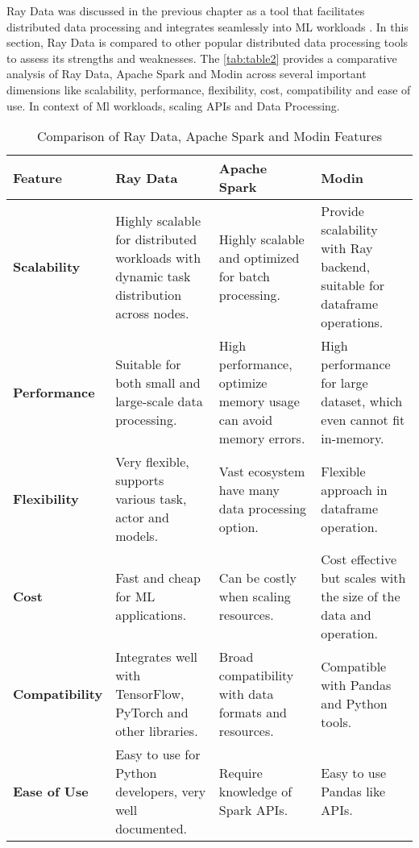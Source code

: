 Ray Data was discussed in the previous chapter as a tool that facilitates distributed data processing and integrates seamlessly into ML workloads \cite{ray_doc}. In this section, Ray Data is compared to other popular distributed data processing tools to assess its strengths and weaknesses. The \autoref{tab:table2} provides a comparative analysis of Ray Data, Apache Spark and Modin across several important dimensions like scalability, performance, flexibility, cost, compatibility and ease of use. In context of Ml workloads, scaling APIs and Data Processing.

\begin{table}[ht]
\centering
\begin{tabular}{|p{3cm}|p{3.5cm}|p{3.5cm}|p{3.5cm}|}
\hline
\textbf{Feature} & \textbf{Ray Data} & \textbf{Apache Spark} & \textbf{Modin} \\
\hline
\textbf{Scalability} & Highly scalable for distributed workloads with dynamic task distribution across nodes. \cite{ray_doc}& Highly scalable and optimized for batch processing. \cite{apache_spark} & Provide scalability with Ray backend, suitable for dataframe operations. \cite{modin_docs} \\
\hline
\textbf{Performance} & Suitable for both small and large-scale data processing. \cite{ray_doc} & High performance, optimize memory usage can avoid memory errors. \cite{apache_spark}& High performance for large dataset, which even cannot fit in-memory. \cite{modin_docs}\\
\hline
\textbf{Flexibility} & Very flexible, supports various task, actor and models. \cite{ray_doc}& Vast ecosystem have many data processing option. \cite{apache_spark} &Flexible approach in dataframe operation. \cite{modin_docs} \\
\hline
\textbf{Cost} & Fast and cheap for ML applications. \cite{ray_doc}& Can be costly when scaling resources. \cite{apache_spark}& Cost effective but scales with the size of the data and operation. \cite{modin_docs} \\
\hline
\textbf{Compatibility} & Integrates well with TensorFlow, PyTorch and other libraries. \cite{ray_doc}& Broad compatibility with data formats and resources. \cite{apache_spark} & Compatible with Pandas and Python tools. \cite{modin_docs} \\
\hline
\textbf{Ease of Use} & Easy to use for Python developers, very well documented. & Require knowledge of Spark APIs. \cite{apache_spark}& Easy to use Pandas like APIs. \cite{modin_docs} \\
\hline
\end{tabular}
\caption{Comparison of Ray Data, Apache Spark and Modin Features}
\label{tab:table2}
\end{table}

